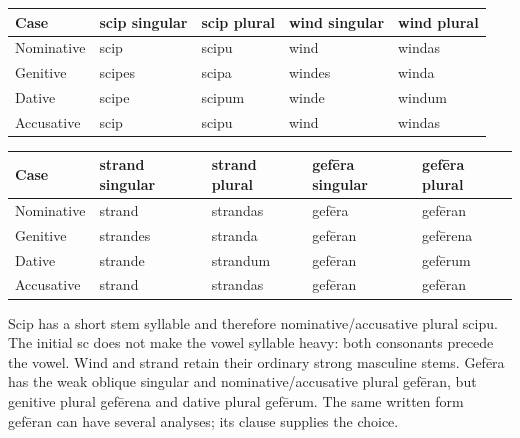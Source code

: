 \par\begingroup
\fontsize{10.5}{13.2}\selectfont
\setlength{\LTleft}{0pt}\setlength{\LTright}{\fill}
\noindent
\begin{tabular}{@{}>{\raggedright\arraybackslash}p{22.0mm}>{\raggedright\arraybackslash}p{22.688mm}>{\raggedright\arraybackslash}p{22.688mm}>{\raggedright\arraybackslash}p{22.688mm}>{\raggedright\arraybackslash}p{22.688mm}@{}}
\toprule
\textbf{Case} & \textbf{scip singular} & \textbf{scip plural} & \textbf{wind singular} & \textbf{wind plural} \\
\midrule
Nominative & scip & scipu & wind & windas \\
Genitive & scipes & scipa & windes & winda \\
Dative & scipe & scipum & winde & windum \\
Accusative & scip & scipu & wind & windas \\
\bottomrule
\end{tabular}
\par\endgroup
\par\begingroup
\fontsize{10.5}{13.2}\selectfont
\setlength{\LTleft}{0pt}\setlength{\LTright}{\fill}
\noindent
\begin{tabular}{@{}>{\raggedright\arraybackslash}p{22.0mm}>{\raggedright\arraybackslash}p{22.688mm}>{\raggedright\arraybackslash}p{22.688mm}>{\raggedright\arraybackslash}p{22.688mm}>{\raggedright\arraybackslash}p{22.688mm}@{}}
\toprule
\textbf{Case} & \textbf{strand singular} & \textbf{strand plural} & \textbf{gefēra singular} & \textbf{gefēra plural} \\
\midrule
Nominative & strand & strandas & gefēra & gefēran \\
Genitive & strandes & stranda & gefēran & gefērena \\
Dative & strande & strandum & gefēran & gefērum \\
Accusative & strand & strandas & gefēran & gefēran \\
\bottomrule
\end{tabular}
\par\endgroup
Scip has a short stem syllable and therefore nominative/\allowbreak{}accusative plural scipu. The initial sc does not make the vowel syllable heavy: both consonants precede the vowel. Wind and strand retain their ordinary strong masculine stems. Gefēra has the weak oblique singular and nominative/\allowbreak{}accusative plural gefēran, but genitive plural gefērena and dative plural gefērum. The same written form gefēran can have several analyses; its clause supplies the choice.

